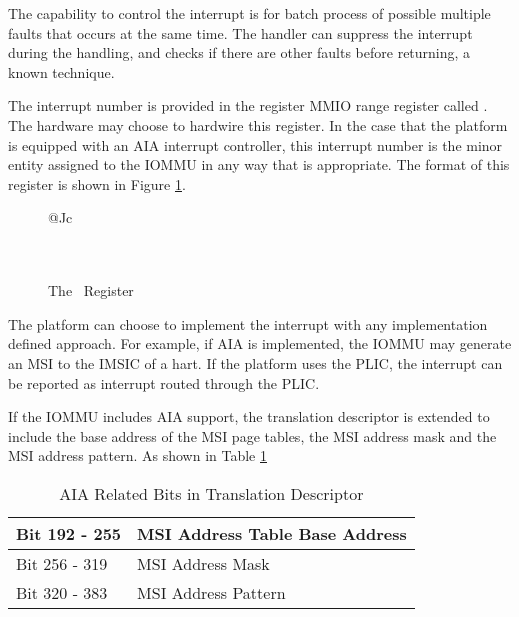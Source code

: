 \note The capability to control the interrupt is for batch process of possible multiple
faults that occurs at the same time. The handler can suppress the interrupt during the
handling, and checks if there are other faults before returning, a known technique. \noteend

The interrupt number is provided in the register MMIO range register called \iommuintno.
The hardware may choose to hardwire this register. In the case that the platform is
equipped with an AIA interrupt controller, this interrupt number is the minor entity
assigned to the IOMMU in any way that is appropriate. The format of this register is shown
in Figure \ref{fig:iommuintno}.

\begin{figure}[h!t]
    \begin{center}
        \begin{tabular}{@{}Jc}
     \\
    \hline
     \\
     \\

    \end{tabular}
    \end{center}

    \caption{The \iommuintno\ Register}
    \label{fig:iommuintno}
\end{figure}


\note The platform can choose to implement the interrupt with any implementation defined
approach. For example, if AIA is implemented, the IOMMU may generate an MSI to the IMSIC
of a hart. If the platform uses the PLIC, the interrupt can be reported as interrupt
routed through the PLIC. \noteend

If the IOMMU includes AIA support, the translation descriptor is extended to include the
base address of the MSI page tables, the MSI address mask and the MSI address pattern. As
shown in Table \ref{tbl:aia-fields}

\begin{table}[h!t]
    \centering
    \begin{tabular}{ | l | l | }

    \hline
    Bit 192 - 255   & MSI Address Table Base Address \\
    \hline
    Bit 256 - 319   & MSI Address Mask \\
    \hline
    Bit 320 - 383   & MSI Address Pattern \\
    \hline

    \end{tabular}
    \caption{AIA Related Bits in Translation Descriptor}
    \label{tbl:aia-fields}
\end{table}


